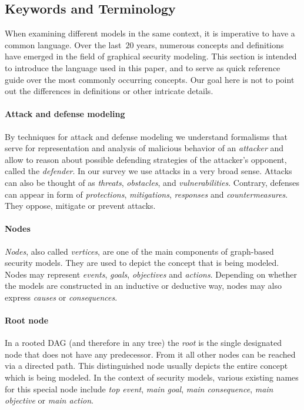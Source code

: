 \documentclass[a4paper]{article}
\begin{document}
\subsection{Keywords and Terminology}
\label{sec:terminology}

When examining different models in the same context, it is imperative to have a 
common language. Over the last~$20$ years, numerous concepts and definitions 
have emerged in the field of graphical security modeling. This section is
intended to introduce the language used in this paper, and to serve as quick 
reference guide over the most commonly occurring concepts. Our goal here is not 
to point out the differences in definitions or other intricate details. 

\paragraph{Attack and defense modeling} 
By techniques for attack and defense modeling we understand formalisms that
serve for representation and analysis of malicious behavior of an
\emph{attacker} and allow to reason about possible defending strategies of the
attacker's opponent, called the \emph{defender}. In our survey we use attacks in
a very broad sense. Attacks can also be thought of as \emph{threats}, 
\emph{obstacles}, and \emph{vulnerabilities}. Contrary, defenses can appear in 
form of \emph{protections}, \emph{mitigations}, \emph{responses} and 
\emph{countermeasures}. They oppose, mitigate or prevent attacks. 

\paragraph{Nodes}
\emph{Nodes}, also called \emph{vertices}, are one of the main components of
graph-based security models. They are used to depict the concept that is being
modeled. Nodes may represent \emph{events}, \emph{goals}, \emph{objectives} and
\emph{actions}. Depending on whether the models are constructed in an inductive
or deductive way, nodes may also express \emph{causes} or \emph{consequences}.

\paragraph{Root node}
In a rooted DAG (and therefore in any tree) the \emph{root} is the single
designated node that does not have any predecessor. From it all other nodes can
be reached via a directed path. This distinguished node usually depicts the
entire concept which is being modeled. In the context of security models, 
various existing names for this special node include \emph{top event}, 
\emph{main goal}, \emph{main consequence}, \emph{main objective} or \emph{main
action}.
\end{document}
